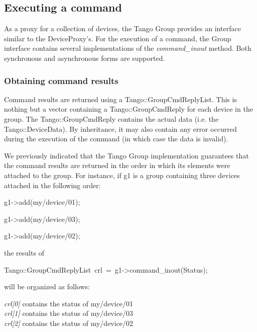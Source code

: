 \subsection{Executing a command}

As a proxy for a collection of devices, the Tango Group provides an
interface similar to the DeviceProxy's. For the execution of a command,
the Group interface contains several implementations
of the \emph{command\_inout} method. Both synchronous
and asynchronous forms are supported. 


\subsubsection{Obtaining command results\label{sub:Obt-cmd-results}}

Command results are returned using a Tango::GroupCmdReplyList.
This is nothing but a vector containing a Tango::GroupCmdReply
for each device in the group. The Tango::GroupCmdReply contains the
actual data (i.e. the Tango::DeviceData). By inheritance, it may also
contain any error occurred during the execution of the command (in
which case the data is invalid). 

We previously indicated that the Tango Group implementation guarantees
that the command results are returned in the order in which its elements
were attached to the group. For instance, if g1 is a group containing
three devices attached in the following order:
\begin{lyxcode}
g1->add(\textquotedbl{}my/device/01\textquotedbl{});

g1->add(\textquotedbl{}my/device/03\textquotedbl{});

g1->add(\textquotedbl{}my/device/02\textquotedbl{});
\end{lyxcode}
the results of 
\begin{lyxcode}
Tango::GroupCmdReplyList~crl~=~g1->command\_inout(\textquotedbl{}Status\textquotedbl{});
\end{lyxcode}
will be organized as follows:

\emph{crl{[}0{]}} contains the status of my/device/01 \\
\emph{crl{[}1{]}} contains the status of my/device/03 \\
\emph{crl{[}2{]}} contains the status of my/device/02

